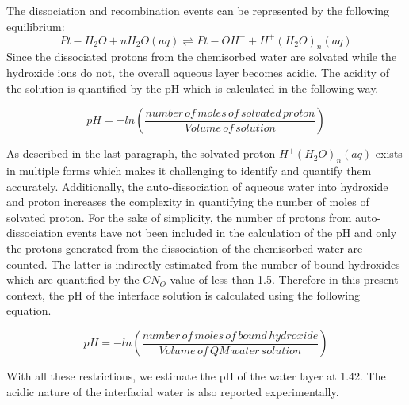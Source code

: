 The dissociation and recombination events can be represented by the following equilibrium:
\begin{equation}
    Pt-H_2O + nH_2O (aq) \rightleftharpoons Pt-OH^- + H^+(H_2O)_n(aq)  
\end{equation}
Since the dissociated protons from the chemisorbed water are solvated while the hydroxide ions do not, the overall aqueous layer becomes acidic. The acidity of the solution is quantified by the pH which is calculated in the following way. 

\begin{equation}
    pH=-ln(\frac{number\, of\, moles\, of\, solvated\, proton}{Volume\, of\, solution})
\end{equation}

\noindent As described in the last paragraph, the solvated proton $H^+(H_2O)_n(aq)$ exists in multiple forms which makes it challenging to identify and quantify them accurately. Additionally, the auto-dissociation of aqueous water into hydroxide and proton increases the complexity in quantifying the number of moles of solvated proton. For the sake of simplicity, the number of protons from auto-dissociation events have not been included in the calculation of the pH and  only the protons generated from the dissociation of the chemisorbed water are counted. The latter is indirectly estimated from the number of bound hydroxides which are quantified by the $CN_O$ value of less than 1.5. 
Therefore in this present context, the pH of the interface solution is calculated using the following equation.

\begin{equation}
    pH=-ln(\frac{number\, of\, moles\, of\, bound\, hydroxide}{Volume\, of\, QM\, water\, solution})
\end{equation}

With all these restrictions, we estimate the pH of the water layer at 1.42. The acidic nature of the interfacial water is also reported experimentally\cite{rizo2015towards,martinez2015exploring}.


